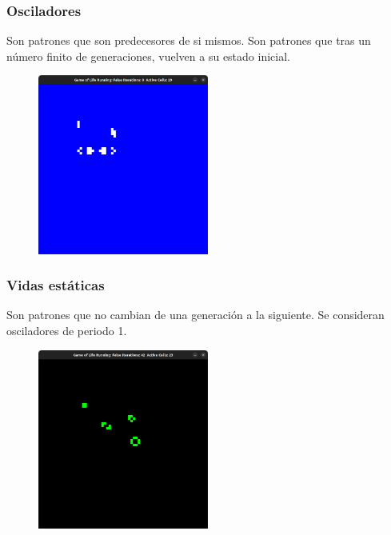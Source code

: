 \documentclass[10pt]{article}
\begin{document}
            \subsubsection{Osciladores}
            Son patrones que son predecesores de si mismos. Son patrones que tras un número finito de generaciones, vuelven a su estado inicial.
            \begin{figure}[h!]
                \centering
                \includegraphics[width=0.5\textwidth]{osciladores.png}
            \end{figure}
            \subsubsection{Vidas estáticas}
            Son patrones que no cambian de una generación a la siguiente. Se consideran osciladores de periodo 1.
            \begin{figure}[h!]
                \centering
                \includegraphics[width=0.5\textwidth]{fijas.png}
            \end{figure}
\end{document}
